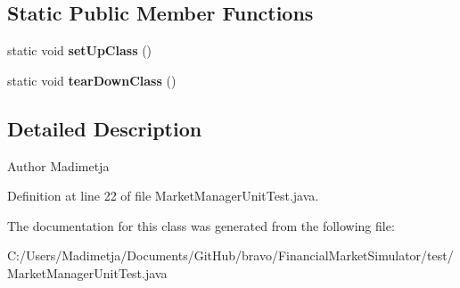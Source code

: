 \subsection*{Static Public Member Functions}
\begin{DoxyCompactItemize}
\item 
\hypertarget{class_market_manager_unit_test_a5ecff1008c99832638bca96b9a12c129}{static void {\bfseries set\+Up\+Class} ()}\label{class_market_manager_unit_test_a5ecff1008c99832638bca96b9a12c129}

\item 
\hypertarget{class_market_manager_unit_test_a6384859a83037cf70ee3a30835e9067e}{static void {\bfseries tear\+Down\+Class} ()}\label{class_market_manager_unit_test_a6384859a83037cf70ee3a30835e9067e}

\end{DoxyCompactItemize}


\subsection{Detailed Description}
\begin{DoxyAuthor}{Author}
Madimetja 
\end{DoxyAuthor}


Definition at line 22 of file Market\+Manager\+Unit\+Test.\+java.



The documentation for this class was generated from the following file\+:\begin{DoxyCompactItemize}
\item 
C\+:/\+Users/\+Madimetja/\+Documents/\+Git\+Hub/bravo/\+Financial\+Market\+Simulator/test/Market\+Manager\+Unit\+Test.\+java\end{DoxyCompactItemize}
